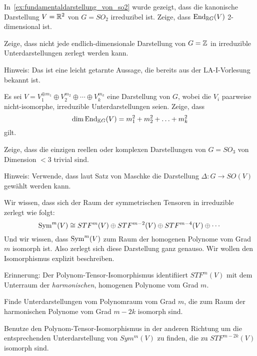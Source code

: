 \begin{sheet}

\begin{problem}[title={Satz von Schur über Körpern $\neq\IC$}]
In~\ref{ex:fundamentaldarstellung_von_so2} wurde gezeigt, dass die kanonische Darstellung $V=\mathbb{R}^2$ von $G=SO_2$ irreduzibel ist. Zeige, dass $\operatorname{End}_{\mathbb{R} G}(V)$ 2-dimensional ist.
\end{problem}

\begin{problem}[title={Der Satz von Maschke ist falsch für nichtkompakte Gruppen}, difficulty={leichter als es aussieht}]
Zeige, dass nicht jede endlich-dimensionale Darstellung von $G=\mathbb{Z}$ in irreduzible Unterdarstellungen zerlegt werden kann.

Hinweis: Das ist eine leicht getarnte Aussage, die bereits aus der LA-I-Vorlesung bekannt ist.
\end{problem}


\begin{problem}
Es sei $V = V_1^{\oplus m_1} \oplus V_2^{m_2} \oplus \cdots \oplus V_k^{m_k}$ eine Darstellung von $G$, wobei die $V_i$ paarweise nicht-isomorphe, irreduzible Unterdarstellungen seien. Zeige, dass
\[\dim \operatorname{End}_{\mathbb{K} G}(V) = m_1^2 + m_2^2 + \ldots + m_k^2\]
gilt.
\end{problem}

\begin{problem}\label{ex:keine_2D_darstellung_von_so3}
Zeige, dass die einzigen reellen oder komplexen Darstellungen von $G=SO_3$ von Dimension $<3$ trivial sind.

Hinweis: Verwende, dass laut Satz von Maschke die Darstellung $\Delta: G\to SO(V)$ gewählt werden kann.
\end{problem}

\begin{problem}
Wir wissen, dass sich der Raum der symmetrischen Tensoren in irreduzible zerlegt wie folgt:
\[\operatorname{Sym}^m(V) \cong STF^m(V) \oplus STF^{m-2}(V) \oplus STF^{m-4}(V) \oplus \cdots\]
Und wir wissen, dass $\operatorname{Sym}^m(V)$ zum Raum der homogenen Polynome vom Grad $m$ isomorph ist. Also zerlegt sich diese Darstellung ganz genauso. Wir wollen den Isomorphismus explizit beschreiben.
\begin{subproblem}
Erinnerung: Der Polynom-Tensor-Isomorphismus identifiiert $STF^m(V)$ mit dem Unterraum der \emph{harmonischen}, homogenen Polynome vom Grad $m$.

Finde Unterdarstellungen vom Polynomraum vom Grad $m$, die zum Raum der harmonischen Polynome vom Grad $m-2k$ isomorph sind.
\end{subproblem}
\begin{subproblem}
Benutze den Polynom-Tensor-Isomorphismus in der anderen Richtung um die entsprechenden Unterdarstellung von $Sym^m(V)$ zu finden, die zu $STF^{m-2k}(V)$ isomorph sind.
\end{subproblem}
\end{problem}

\end{sheet}